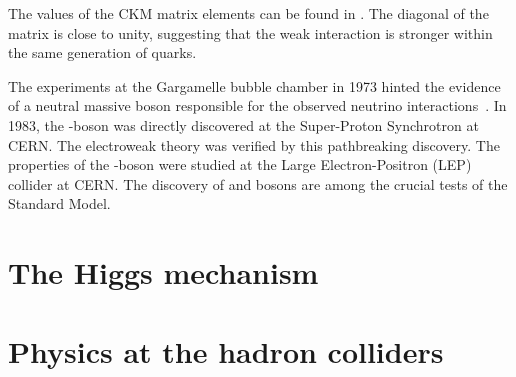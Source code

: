 The values of the CKM matrix elements can be found in \cite{pdg2024}. The diagonal
of the matrix is close to unity, suggesting that the weak interaction is stronger within
the same generation of quarks. 

The experiments at the Gargamelle bubble chamber in 1973 hinted the evidence of a neutral
massive boson responsible for the observed neutrino interactions~\cite{HASERT1973138}. In 1983, the \PZ-boson
was directly discovered at the Super-Proton Synchrotron at CERN. The electroweak theory
was verified by this pathbreaking discovery. The properties of the \PZ-boson were
studied at the Large Electron-Positron (LEP) collider at CERN. The discovery of \PZ and \PW 
bosons are among the crucial tests of the Standard Model. 


\section{The Higgs mechanism}

\section{Physics at the hadron colliders}
















